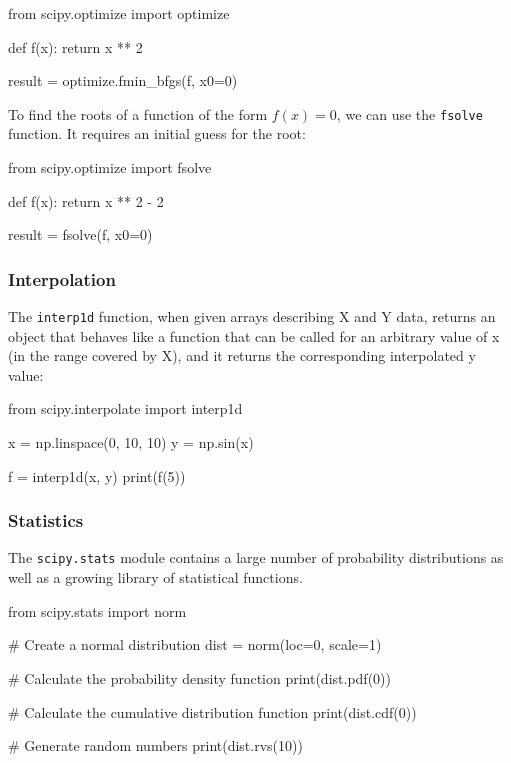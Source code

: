 \begin{codeblock}[language=python]
from scipy.optimize import optimize 

def f(x):
    return x ** 2

result = optimize.fmin_bfgs(f, x0=0)
\end{codeblock}

To find the roots of a function of the form $f(x) = 0$, we can use the \texttt{fsolve} function. It requires an initial guess for the root:

\begin{codeblock}[language=python]
from scipy.optimize import fsolve

def f(x):
    return x ** 2 - 2

result = fsolve(f, x0=0)
\end{codeblock}

\subsubsection*{Interpolation}

The \texttt{interp1d} function, when given arrays describing X and Y data, returns an object that
behaves like a function that can be called for an arbitrary value of x (in the range covered by X),
and it returns the corresponding interpolated y value:

\begin{codeblock}[language=python]
from scipy.interpolate import interp1d

x = np.linspace(0, 10, 10)
y = np.sin(x)

f = interp1d(x, y)
print(f(5))
\end{codeblock}

\subsubsection*{Statistics}

The \texttt{scipy.stats} module contains a large number of probability distributions as well as a growing library of statistical functions.

\begin{codeblock}[language=python]
from scipy.stats import norm

# Create a normal distribution
dist = norm(loc=0, scale=1)

# Calculate the probability density function
print(dist.pdf(0))

# Calculate the cumulative distribution function
print(dist.cdf(0))

# Generate random numbers
print(dist.rvs(10))
\end{codeblock}

